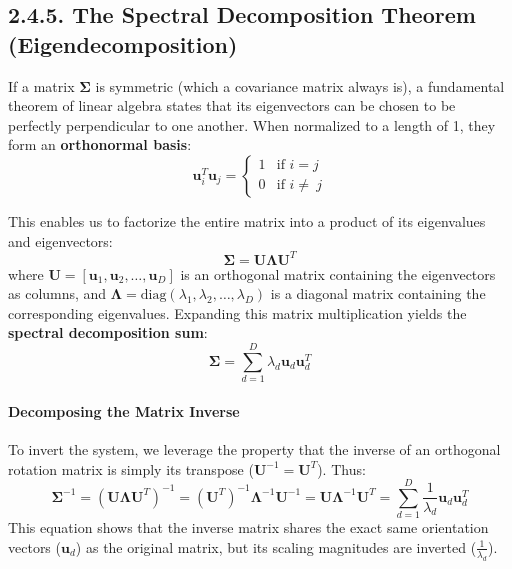 \documentclass{article}
\begin{document}
\subsection*{2.4.5. The Spectral Decomposition Theorem (Eigendecomposition)}
If a matrix $\boldsymbol{\Sigma}$ is symmetric (which a covariance matrix always is), a fundamental theorem of linear algebra states that its eigenvectors can be chosen to be perfectly perpendicular to one another. When normalized to a length of 1, they form an \textbf{orthonormal basis}:
\begin{equation*}
\mathbf{u}_i^T \mathbf{u}_j = \begin{cases} 1 & \text{if } i = j \\ 0 & \text{if } i \neq \ j \end{cases}
\end{equation*}

This enables us to factorize the entire matrix into a product of its eigenvalues and eigenvectors:
\begin{equation*}
\boldsymbol{\Sigma} = \mathbf{U} \boldsymbol{\Lambda} \mathbf{U}^T
\end{equation*}
where $\mathbf{U} = [\mathbf{u}_1, \mathbf{u}_2, \dots, \mathbf{u}_D]$ is an orthogonal matrix containing the eigenvectors as columns, and $\boldsymbol{\Lambda} = \text{diag}(\lambda_1, \lambda_2, \dots, \lambda_D)$ is a diagonal matrix containing the corresponding eigenvalues. Expanding this matrix multiplication yields the \textbf{spectral decomposition sum}:
\begin{equation*}
\boldsymbol{\Sigma} = \sum_{d=1}^D \lambda_d \mathbf{u}_d \mathbf{u}_d^T
\end{equation*}

\paragraph{Decomposing the Matrix Inverse}
To invert the system, we leverage the property that the inverse of an orthogonal rotation matrix is simply its transpose ($\mathbf{U}^{-1} = \mathbf{U}^T$). Thus:
\begin{equation*}
\boldsymbol{\Sigma}^{-1} = (\mathbf{U} \boldsymbol{\Lambda} \mathbf{U}^T)^{-1} = (\mathbf{U}^T)^{-1} \boldsymbol{\Lambda}^{-1} \mathbf{U}^{-1} = \mathbf{U} \boldsymbol{\Lambda}^{-1} \mathbf{U}^T = \sum_{d=1}^D \frac{1}{\lambda_d} \mathbf{u}_d \mathbf{u}_d^T
\end{equation*}
This equation shows that the inverse matrix shares the exact same orientation vectors ($\mathbf{u}_d$) as the original matrix, but its scaling magnitudes are inverted ($\frac{1}{\lambda_d}$).
\end{document}
